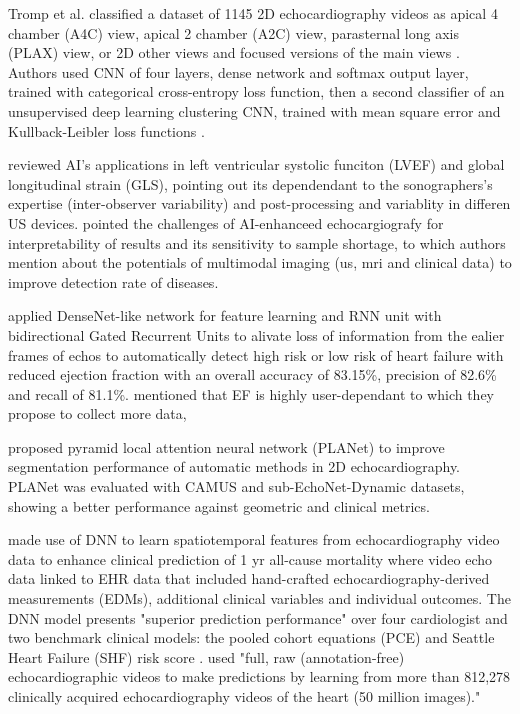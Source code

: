 Tromp et al. classified a dataset of 1145 2D echocardiography videos as apical 4 chamber (A4C) view, apical 2 chamber (A2C) view, parasternal long axis (PLAX) view, or 2D other views and focused versions of the main views \cite{tromp2022}.
Authors used CNN of four layers, dense network and softmax output layer, trained with categorical cross-entropy loss function, then a second classifier of an unsupervised deep learning clustering CNN, trained with mean square error and Kullback-Leibler loss functions \cite{tromp2022}.

\cite{zhang2022-mdpi}
reviewed AI's applications in left ventricular systolic funciton (LVEF) and global longitudinal strain (GLS), pointing out its dependendant to the sonographers's expertise (inter-observer variability) and post-processing and variablity in differen US devices.
\cite{zhang2022-mdpi} pointed the challenges of AI-enhanceed echocargiografy for interpretability of results and its sensitivity to sample shortage, to which authors mention about the potentials of multimodal imaging (us, mri and clinical data) to improve detection rate of diseases. 

\cite{behnami2020} applied DenseNet-like network for feature learning and RNN unit with bidirectional Gated Recurrent Units to alivate loss of information from the ealier frames of echos to automatically detect high risk or low risk of heart failure with reduced ejection fraction with an overall accuracy of 83.15\%, precision of 82.6\% and recall of 81.1\%.
\cite{behnami2020} mentioned that EF is highly user-dependant to which they propose to collect more data,

\cite{liu2021JMIA} proposed pyramid local attention neural network (PLANet) to improve segmentation performance of automatic methods in 2D echocardiography.
PLANet was evaluated with CAMUS and sub-EchoNet-Dynamic datasets, showing a better performance against geometric and clinical metrics.

\cite{ulloaCerna2021} made use of DNN to learn spatiotemporal features from echocardiography video data to enhance clinical prediction of 1 yr all-cause mortality where video echo data linked to EHR data that included hand-crafted echocardiography-derived measurements (EDMs), additional clinical variables and individual outcomes.
The DNN model presents "superior prediction performance" over four cardiologist and two benchmark clinical models: the pooled cohort equations (PCE) and Seattle Heart Failure (SHF) risk score \cite{ulloaCerna2021}. 
\cite{ulloaCerna2021} used "full, raw (annotation-free) echocardiographic videos to make predictions by learning from more than 812,278 clinically acquired echocardiography videos of the heart (50 million images)."

